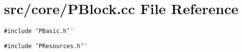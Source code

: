 \section{src/core/PBlock.cc File Reference}
\label{PBlock_8cc}


{\tt \#include \char`\"{}PBasic.h\char`\"{}}\par
{\tt \#include \char`\"{}PResources.h\char`\"{}}\par
